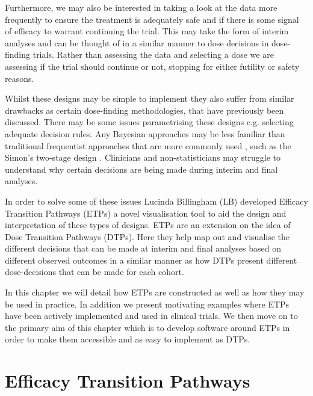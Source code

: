 Furthermore, we may also be interested in taking a look at the data more frequently to ensure the treatment is adequately safe and if there is some signal of efficacy to warrant continuing the trial. This may take the form of interim analyses and can be thought of in a similar manner to dose decisions in dose-finding trials. Rather than assessing the data and selecting a dose we are assessing if the trial should continue or not, stopping for either futility or safety reasons.  

Whilst these designs may be simple to implement they also suffer from similar drawbacks as certain dose-finding methodologies, that have previously been discussed. There may be some issues parametrising these designs e.g. selecting adequate decision rules. Any Bayesian approaches may be less familiar than traditional frequentist approaches that are more commonly used \cite{ivanovaNineyearChangeStatistical2016}, such as the Simon's two-stage design \cite{simonOptimalTwostageDesigns1989}. Clinicians and non-statisticians may struggle to understand why certain decisions are being made during interim and final analyses. 

In order to solve some of these issues Lucinda Billingham (LB) developed Efficacy Transition Pathways (ETPs) a novel visualisation tool to aid the design and interpretation of these types of designs. ETPs are an extension on the idea of Dose Transition Pathways (DTPs). Here they help map out and visualise the different decisions that can be made at interim and final analyses based on different observed outcomes in a similar manner as how DTPs present different dose-decisions that can be made for each cohort. 

In this chapter we will detail how ETPs are constructed as well as how they may be used in practice. In addition we present motivating examples where ETPs have been actively implemented and used in clinical trials. We then move on to the primary aim of this chapter which is to develop software around ETPs in order to make them accessible and as easy to implement as DTPs. 


\section{Efficacy Transition Pathways}
\label{etp:ETPs}

